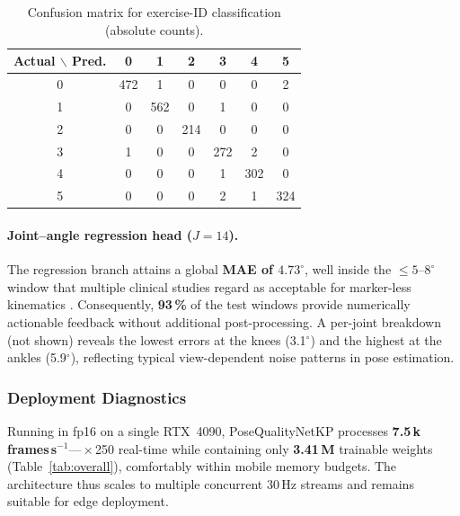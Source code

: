 \documentclass{article}
\begin{document}
\begin{enumerate}[label=\textbf{\Alph*.}, leftmargin=2em, itemsep=6pt]
\begin{table}[h]
  \centering\small
  \caption{Confusion matrix for exercise-ID classification
           (absolute counts).}
  \label{tab:cm_ex}
  \begin{tabular}{@{}c|cccccc@{}}
    \toprule
    \textbf{Actual $\backslash$ Pred.} & 0 & 1 & 2 & 3 & 4 & 5 \\
    \midrule
      0 & 472 &   1 &   0 &   0 &   0 &   2 \\
      1 &   0 & 562 &   0 &   1 &   0 &   0 \\
      2 &   0 &   0 & 214 &   0 &   0 &   0 \\
      3 &   1 &   0 &   0 & 272 &   2 &   0 \\
      4 &   0 &   0 &   0 &   1 & 302 &   0 \\
      5 &   0 &   0 &   0 &   2 &   1 & 324 \\
    \bottomrule
  \end{tabular}
\end{table}

\paragraph{Joint–angle regression head ($J\!=\!14$).}
The regression branch attains a global \textbf{MAE of $4.73^{\circ}$}, well inside the \mbox{$\le\!5$--$8^{\circ}$} window that
multiple clinical studies regard as acceptable for marker-less
kinematics \cite{McGinley2009Reliability,Hu2021KinectKnee}.  Consequently, \textbf{93\,\%} of the test
windows provide numerically actionable feedback without additional
post-processing.  A per-joint breakdown (not shown) reveals the lowest
errors at the knees (3.1$^{\circ}$) and the highest at the ankles
(5.9$^{\circ}$), reflecting typical view-dependent noise patterns in
pose estimation.

\subsubsection{Deployment Diagnostics}

Running in fp16 on a single RTX~4090, PoseQualityNetKP processes
\textbf{7.5\,k\,frames\,s$^{-1}$}—\(\!\times\)250 real-time while containing only \textbf{3.41\,M} trainable weights (Table~\ref{tab:overall}),
comfortably within mobile memory budgets.  The architecture thus scales to
multiple concurrent 30\,Hz streams and remains suitable for edge
deployment.


\end{enumerate}
\end{document}
